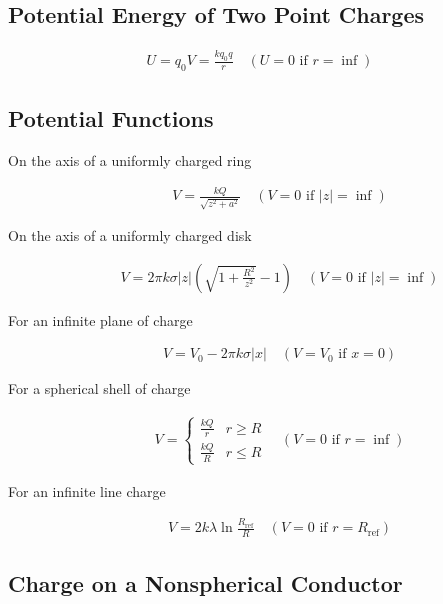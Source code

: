 \documentclass[../main.tex]{subfiles}
\begin{document}
\subsection{Potential Energy of Two Point Charges}
\label{sub:potential_energy_of_two_point_charges}

\begin{align}
  U = q_0V=\frac{kq_0q}{r}\quad(U=0\text{ if }r=\inf)
\end{align}

\subsection{Potential Functions}
\label{sub:potential_functions}

\begin{description}
  \item[On the axis of a uniformly charged ring]
    \begin{align}
      V=\frac{kQ}{\sqrt{z^2+a^2}}\quad(V=0\text{ if }|z|=\inf)
    \end{align}
  \item[On the axis of a uniformly charged disk]
    \begin{align}
      V=2\pi k\sigma|z|\left(\sqrt{1+\frac{R^2}{z^2}} - 1\right)\quad(V=0\text{ if }|z|=\inf)
    \end{align}
  \item[For an infinite plane of charge]
    \begin{align}
      V = V_0 -2\pi k \sigma |x|\quad(V=V_0\text{ if }x=0)
    \end{align}
  \item[For a spherical shell of charge]
    \begin{align}
      V=\left\{\begin{array}{ll}\frac{kQ}{r} & r\geq R\\\frac{kQ}{R} & r \leq
      R\end{array}\right.\quad (V=0\text{ if }r=\inf)
    \end{align}
  \item[For an infinite line charge]
    \begin{align}
      V=2k\lambda\ln\frac{R_{\text{ref}}}{R}\quad(V=0\text{ if }r=R_{\text{ref}})
    \end{align}
\end{description}

\subsection{Charge on a Nonspherical Conductor}
\label{sub:charge_on_a_nonspherical_conductor}
\end{document}
